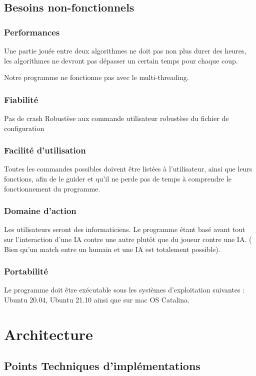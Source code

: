 \huge\documentclass{article}
\begin{document}
    \subsection{Besoins non-fonctionnels}

    \subsubsection{Performances}
    Une partie jouée entre deux algorithmes ne doit pas non plus durer des heures, les algorithmes ne devront pas dépasser un certain temps pour chaque coup.

    Notre programme ne fonctionne pas avec le multi-threading.

    \subsubsection{Fiabilité}
    Pas de crash
    Robustèse aux commande utilisateur
    robustèse du fichier de configuration

    \subsubsection{Facilité d'utilisation}
    Toutes les commandes possibles doivent être listées à l'utilisateur, ainsi que leurs fonctions, afin de le guider et qu'il ne perde pas de temps à comprendre le fonctionnement du programme.

    \subsubsection{Domaine d'action}
    Les utilisateurs seront des informaticiens. Le programme étant basé avant tout sur l'interaction d'une IA contre une autre plutôt que du joueur contre une IA. ( Bien qu'un match entre un humain et une IA est totalement possible).

    \subsubsection{Portabilité}
    Le programme doit être exécutable sous les systèmes d'exploitation suivantes : Ubuntu 20.04, Ubuntu 21.10 ainsi que sur mac OS Catalina.


    \section{Architecture}

    \subsection{Points Techniques d'implémentations}
\end{document}
